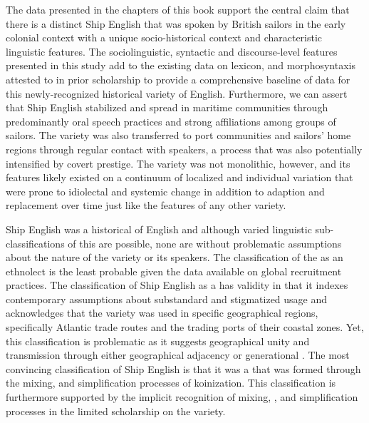 The data presented in the chapters of this book support the central claim that there is a distinct Ship English that was spoken by British sailors in the early colonial context with a unique socio-historical context and characteristic linguistic features. The sociolinguistic, syntactic and discourse-level features presented in this study add to the existing data on lexicon,  and morphosyntaxis attested to in prior scholarship to provide a comprehensive baseline of data for this newly-recognized historical variety of English. Furthermore, we can assert that Ship English stabilized and spread in maritime communities through predominantly oral speech practices and strong affiliations among groups of sailors. The variety was also transferred to port communities and sailors’ home regions through regular contact with speakers, a process that was also potentially intensified by covert prestige. The variety was not monolithic, however, and its features likely existed on a continuum of localized and individual variation that were prone to idiolectal and systemic change in addition to adaption and replacement over time just like the features of any other variety. 

Ship English was a historical  of English and although varied linguistic sub-classifications of this  are possible, none are without problematic assumptions about the nature of the variety or its speakers. The classification of the  as an ethnolect is the least probable given the data available on global recruitment practices. The classification of Ship English as a  has validity in that it indexes contemporary assumptions about {substandard and stigmatized usage and acknowledges that the variety was used in specific geographical regions, specifically Atlantic trade routes} and the trading ports of their coastal zones. {Yet, this classification} is problematic{ as it suggests} geographical unity and transmission through either geographical adjacency or generational . The most convincing classification of Ship English is that it was a  that was formed through the mixing,  and simplification processes of koinization. This classification is furthermore supported by the implicit recognition of mixing, , and simplification processes in the limited scholarship on the variety.

